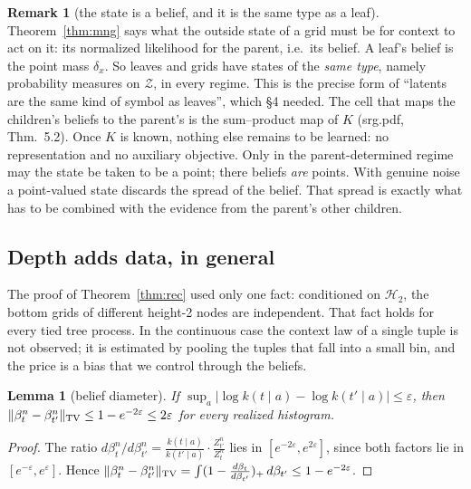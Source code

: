 \documentclass[11pt]{article}
\newtheorem{lemma}[theorem]{Lemma}
\theoremstyle{definition}
\newtheorem{remark}[theorem]{Remark}
\newcommand{\norm}[1]{\lVert #1\rVert}
\newcommand{\cH}{\mathcal H}
\begin{document}
\begin{remark}[the state is a belief, and it is the same type as a leaf]\label{rem:belief}
Theorem~\ref{thm:mng} says what the outside state of a grid must be for context to act on it: its
normalized likelihood for the parent, i.e.\ its belief. A leaf's belief is the point mass
$\delta_x$. So leaves and grids have states of the \emph{same type}, namely probability measures
on $\mathcal Z$, in every regime. This is the precise form of ``latents are the same kind of
symbol as leaves'', which \S4 needed. The cell that maps the children's beliefs to the parent's is
the sum--product map of $K$ (srg.pdf, Thm.~5.2). Once $K$ is known, nothing else remains to be
learned: no representation and no auxiliary objective. Only in the parent-determined regime may
the state be taken to be a point; there beliefs \emph{are} points. With genuine noise a
point-valued state discards the spread of the belief. That spread is exactly what has to be
combined with the evidence from the parent's other children.
\end{remark}

\subsection{Depth adds data, in general}
The proof of Theorem~\ref{thm:rec} used only one fact: conditioned on $\cH_2$, the bottom grids of
different height-2 nodes are independent. That fact holds for every tied tree process. In the
continuous case the context law of a single tuple is not observed; it is estimated by pooling the
tuples that fall into a small bin, and the price is a bias that we control through the beliefs.

\begin{lemma}[belief diameter]\label{lem:beliefdiam}
If $\sup_a|\log k(t\mid a)-\log k(t'\mid a)|\le\varepsilon$, then
$\norm{\beta^n_t-\beta^n_{t'}}_{\rm TV}\le1-e^{-2\varepsilon}\le2\varepsilon$ for every realized
histogram.
\end{lemma}
\begin{proof}
The ratio $d\beta^n_t/d\beta^n_{t'}=\frac{k(t\mid a)}{k(t'\mid a)}\cdot\frac{Z^n_{t'}}{Z^n_t}$ lies in
$[e^{-2\varepsilon},e^{2\varepsilon}]$, since both factors lie in $[e^{-\varepsilon},e^{\varepsilon}]$. Hence
$\norm{\beta^n_t-\beta^n_{t'}}_{\rm TV}=\int(1-\tfrac{d\beta_t}{d\beta_{t'}})_+\,d\beta_{t'}\le1-e^{-2\varepsilon}$.
\end{proof}
\end{document}
